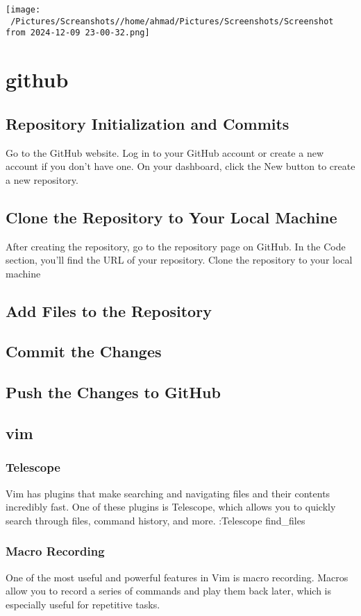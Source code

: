 \usepackage{graphicx}

\texttt{[image: ‍~/Pictures/Screanshots//home/ahmad/Pictures/Screenshots/Screenshot from 2024-12-09 23-00-32.png]}


\section{github}
\subsection{Repository Initialization and Commits}
Go to the GitHub website.
Log in to your GitHub account or create a new account if you don't have one.
On your dashboard, click the New button to create a new repository.
\subsection{Clone the Repository to Your Local Machine}
After creating the repository, go to the repository page on GitHub.
In the Code section, you'll find the URL of your repository.
Clone the repository to your local machine
\subsection{Add Files to the Repository}
\subsection{Commit the Changes}
\subsection{Push the Changes to GitHub}





\subsection{vim}
\subsubsection{Telescope}
Vim has plugins that make searching and navigating files and their contents incredibly fast. One of 
these plugins is Telescope, which allows you to quickly search through files, command history, and more.
:Telescope find_files

\subsubsection{Macro Recording}
One of the most useful and powerful features in Vim is macro recording. Macros allow you to 
record a series of commands and play them back later, which is especially useful for repetitive tasks.

